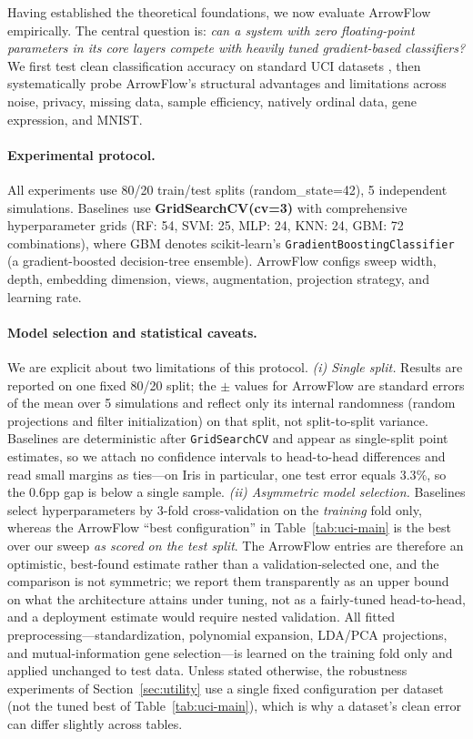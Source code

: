 \documentclass[12pt]{article}
\begin{document}
Having established the theoretical foundations, we now evaluate ArrowFlow empirically. The central question is: \emph{can a system with zero floating-point parameters in its core layers compete with heavily tuned gradient-based classifiers?} We first test clean classification accuracy on standard UCI datasets \citep{dua2019uci}, then systematically probe ArrowFlow's structural advantages and limitations across noise, privacy, missing data, sample efficiency, natively ordinal data, gene expression, and MNIST.

\paragraph{Experimental protocol.} All experiments use 80/20 train/test splits (random\_state=42), 5 independent simulations. Baselines use \textbf{GridSearchCV(cv=3)} with comprehensive hyperparameter grids (RF: 54, SVM: 25, MLP: 24, KNN: 24, GBM: 72 combinations), where GBM denotes scikit-learn's \texttt{GradientBoostingClassifier} (a gradient-boosted decision-tree ensemble). ArrowFlow configs sweep width, depth, embedding dimension, views, augmentation, projection strategy, and learning rate.

\paragraph{Model selection and statistical caveats.} We are explicit about two limitations of this protocol. \emph{(i) Single split.} Results are reported on one fixed 80/20 split; the $\pm$ values for ArrowFlow are standard errors of the mean over 5 simulations and reflect only its internal randomness (random projections and filter initialization) on that split, not split-to-split variance. Baselines are deterministic after \texttt{GridSearchCV} and appear as single-split point estimates, so we attach no confidence intervals to head-to-head differences and read small margins as ties---on Iris in particular, one test error equals $3.3\%$, so the $0.6$pp gap is below a single sample. \emph{(ii) Asymmetric model selection.} Baselines select hyperparameters by 3-fold cross-validation on the \emph{training} fold only, whereas the ArrowFlow ``best configuration'' in Table~\ref{tab:uci-main} is the best over our sweep \emph{as scored on the test split}. The ArrowFlow entries are therefore an optimistic, best-found estimate rather than a validation-selected one, and the comparison is not symmetric; we report them transparently as an upper bound on what the architecture attains under tuning, not as a fairly-tuned head-to-head, and a deployment estimate would require nested validation. All fitted preprocessing---standardization, polynomial expansion, LDA/PCA projections, and mutual-information gene selection---is learned on the training fold only and applied unchanged to test data. Unless stated otherwise, the robustness experiments of Section~\ref{sec:utility} use a single fixed configuration per dataset (not the tuned best of Table~\ref{tab:uci-main}), which is why a dataset's clean error can differ slightly across tables.
\end{document}
